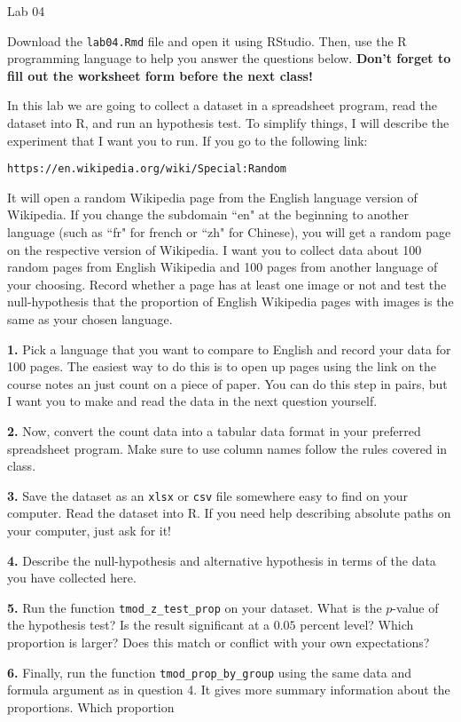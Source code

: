 \documentclass{tufte-handout}
\begin{document}
\justify

{\LARGE Lab 04}

\vspace*{18pt}

Download the \texttt{lab04.Rmd} file and open it using RStudio. Then, use the
R programming language to help you answer the questions below. \textbf{Don't
forget to fill out the worksheet form before the next class!}

In this lab we are going to collect a dataset in a spreadsheet
program, read the dataset into R, and run an hypothesis test. To simplify
things, I will describe the experiment that I want you to run. If you go
to the following link:
\begin{center}
\texttt{https://en.wikipedia.org/wiki/Special:Random}
\end{center}
It will open a random Wikipedia page from the English language version of
Wikipedia. If you change the subdomain ``en" at the beginning to another
language (such as ``fr" for french or ``zh" for Chinese), you will get a random
page on the respective version of Wikipedia. I want you to collect data about
100 random pages from English Wikipedia and 100 pages from another language of
your choosing. Record whether a page has at least one image or not and test
the null-hypothesis that the proportion of English Wikipedia pages with images
is the same as your chosen language.

\vspace*{12pt}

\textbf{1.} Pick a language that you want to compare to English and record
your data for 100 pages. The easiest way to do this is to open up pages using
the link on the course notes an just count on a piece of paper. You can do
this step in pairs, but I want you to make and read the data in the next
question yourself.

\textbf{2.} Now, convert the count data into a tabular data format in your
preferred spreadsheet program. Make sure to use column names follow the rules
covered in class.

\textbf{3.} Save the dataset as an \texttt{xlsx} or \texttt{csv} file
somewhere easy to find on your computer. Read the dataset into R. If you need
help  describing absolute paths on your computer, just ask for it!

\textbf{4.} Describe the null-hypothesis and alternative hypothesis in terms
of the data you have collected here.

\textbf{5.} Run the function \texttt{tmod\_z\_test\_prop} on your dataset.
What is the $p$-value of the hypothesis test? Is the result significant at a
$0.05$ percent level? Which proportion is larger? Does this match or conflict
with your own expectations?

\textbf{6.} Finally, run the function \texttt{tmod\_prop\_by\_group} using
the same data and formula argument as in question 4. It gives more summary
information about the proportions. Which proportion
\end{document}
